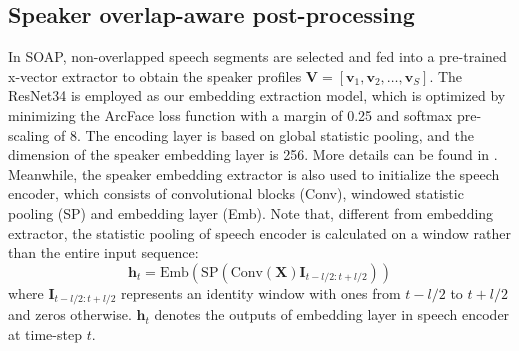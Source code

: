 \documentclass{article}
\begin{document}
\subsection{Speaker overlap-aware post-processing}
In SOAP, non-overlapped speech segments are selected and fed into a pre-trained x-vector extractor to obtain the speaker profiles $\mathbf{V}=[\mathbf{v}_1,\mathbf{v}_2,\dots,\mathbf{v}_S]$. The ResNet34 \cite{HeZRS16} is employed as our embedding extraction model, which is optimized by minimizing the ArcFace loss function \cite{DengGXZ19} with a margin of 0.25 and softmax pre-scaling of 8. The encoding layer is based on global statistic pooling, and the dimension of the speaker embedding layer is 256. More details can be found in \cite{EAND}. Meanwhile, the speaker embedding extractor is also used to initialize the speech encoder, which consists of convolutional blocks (Conv), windowed statistic pooling (SP) and embedding layer (Emb).
Note that, different from embedding extractor, the statistic pooling of speech encoder is calculated on a window rather than the entire input sequence:
\begin{equation}
		\mathbf{h}_t =\text{Emb}(\text{SP}(\text{Conv}(\mathbf{X}) \mathbf{I}_{t-l/2:t+l/2}))
\end{equation}
where $\mathbf{I}_{t-l/2:t+l/2}$ represents an identity window with ones from $t - l/2$ to $t + l/2$ and zeros otherwise. $\mathbf{h}_t$ denotes the outputs of embedding layer in speech encoder at time-step $t$.
\end{document}
